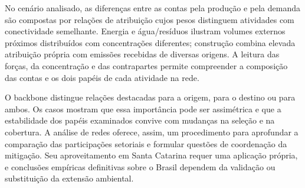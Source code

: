 \documentclass[12pt]{article}
\begin{document}
No cenário analisado, as diferenças entre as contas pela produção e pela demanda são compostas por relações de atribuição cujos pesos distinguem atividades com conectividade semelhante. Energia e água/resíduos ilustram volumes externos próximos distribuídos com concentrações diferentes; construção combina elevada atribuição própria com emissões recebidas de diversas origens. A leitura das forças, da concentração e das contrapartes permite compreender a composição das contas e os dois papéis de cada atividade na rede.

O backbone distingue relações destacadas para a origem, para o destino ou para ambos. Os casos mostram que essa importância pode ser assimétrica e que a estabilidade dos papéis examinados convive com mudanças na seleção e na cobertura. A análise de redes oferece, assim, um procedimento para aprofundar a comparação das participações setoriais e formular questões de coordenação da mitigação. Seu aproveitamento em Santa Catarina requer uma aplicação própria, e conclusões empíricas definitivas sobre o Brasil dependem da validação ou substituição da extensão ambiental.

{\renewcommand*{\bibfont}{\small}
\printbibliography[title={Referências}]
}

\end{document}
